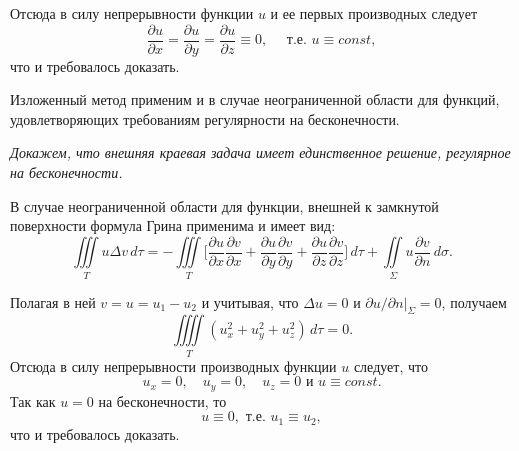 Отсюда в силу непрерывности функции $u$ и ее первых производных следует 
\begin{equation*}
	\frac{\partial u}{\partial x} = \frac{\partial u}{\partial y} = \frac{\partial u}{\partial z} \equiv 0, \quad \text{ т.е. } u \equiv const,
\end{equation*}
что и требовалось доказать. 

Изложенный метод применим и в случае неограниченной области для функций, удовлетворяющих требованиям регулярности на бесконечности.
\newline 

\textit{Докажем, что внешняя краевая задача имеет единственное решение, регулярное на бесконечности.}

В случае неограниченной области для функции, внешней к замкнутой поверхности формула Грина применима и имеет вид:
\begin{equation} \label{out_green}
	\iiint \limits_{T} u \Delta v \, d\tau = - \iiint \limits_{T} \Bigg[\frac{\partial u}{\partial x}\frac{\partial v}{\partial x} + \frac{\partial u}{\partial y}\frac{\partial v}{\partial y} + \frac{\partial u}{\partial z}\frac{\partial v}{\partial z}\Bigg] \, d\tau + \iint \limits_{\Sigma} u \frac{\partial v}{\partial n} \, d\sigma.
\end{equation}

Полагая в ней $v = u = u_1 - u_2$ и учитывая, что $\Delta u = 0$ и $\partial u / \partial n |_{\Sigma} = 0$, получаем
\begin{equation}
	\iiiint \limits_{T} (u_x^2 + u_y^2 + u_z^2) \, d\tau = 0.
\end{equation}
Отсюда в силу непрерывности производных функции $u$ следует, что 
\begin{equation*}
	u_x = 0, \quad u_y = 0, \quad u_z = 0 \text{ и } u \equiv const. 
\end{equation*}
Так как $u = 0$ на бесконечности, то
\begin{equation}
	u \equiv 0, \text{ т.е. } u_1 \equiv u_2,
\end{equation}
что и требовалось доказать.  